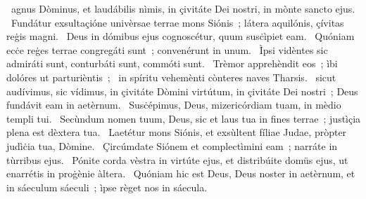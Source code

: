 { }
{%
~agnus Dòminus, et laudábilis nìmis, in çivitáte Dei nostri, in mònte sancto ejus. 
~Fundátur exsultaçióne univèrsae terrae mons Siónis~; látera aquilónis, çívitas reġis magni. 
~Deus in dómibus ejus cognoscétur, quum susċìpiet eam. 
~Quóniam ecċe reġes terrae congregáti sunt~; convenérunt in unum. 
~Ìpsi vidèntes sic admiráti sunt, conturbáti sunt, commóti sunt. 
~Trèmor apprehèndit eos~; ìbi dolóres ut parturièntis~; 
~in spíritu vehemènti cònteres naves Tharsis. 
~sicut audívimus, sic vídimus, in çivitáte Dòmini virtútum, in çivitáte Dei nostri~; Deus fundávit eam in aetèrnum. 
~Susċépimus, Deus, mizericórdiam tuam, in mèdio templi tui. 
~Secùndum nomen tuum, Deus, sic et laus tua in fines terrae~; justìçia plena est dèxtera tua. 
~Laetétur mons Siónis, et exsùltent fíliae Judae, pròpter judìċia tua, Dòmine. 
~Çircúmdate Siónem et complectìmini eam~; narráte in tùrribus ejus. 
~Pónite corda vèstra in virtúte ejus, et distribúite domüs ejus, ut enarrétis in proġènie àltera. 
~Quóniam hic est Deus, Deus noster in aetèrnum, et in sáeculum sáeculi~; ìpse règet nos in sáecula. 
}
